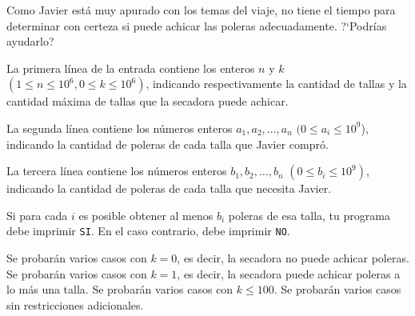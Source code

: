 \documentclass{oci}
\begin{document}
\begin{problemDescription}
Como Javier está muy apurado con los temas del viaje, no tiene el tiempo para determinar
con certeza si puede achicar las poleras adecuadamente.
?`Podrías ayudarlo?
\end{problemDescription}

\begin{inputDescription}
La primera línea de la entrada contiene los enteros $n$ y $k$ $(1 \leq n \leq 10^6, 0 \leq k \leq 10^6)$,
indicando respectivamente la cantidad de tallas y la cantidad máxima de tallas que la secadora puede achicar.

La segunda línea contiene los números enteros $a_1, a_2, \dots, a_n$ $(0 \leq a_i \leq 10^9$),
indicando la cantidad de poleras de cada talla que Javier compró.

La tercera línea contiene los números enteros $b_1, b_2, \dots, b_n$ $(0 \leq b_i \leq 10^9)$, indicando
la cantidad de poleras de cada talla que necesita Javier.
\end{inputDescription}

\begin{outputDescription}
Si para cada $i$ es posible obtener al menos $b_i$ poleras de esa talla, tu programa debe imprimir
\texttt{SI}.
En el caso contrario, debe imprimir \texttt{NO}.
\end{outputDescription}

\begin{scoreDescription}
  Se probarán varios casos con $k=0$, es decir, la secadora no puede achicar poleras.
  Se probarán varios casos con $k=1$, es decir, la secadora puede achicar poleras a lo más una talla.
  Se probarán varios casos con $k \leq 100$.
  Se probarán varios casos sin restricciones adicionales.
\end{scoreDescription}
\end{document}
